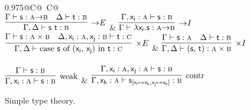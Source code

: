 \begin{figure}
	\centering
	\begin{tabularx}{0.975\textwidth}{@{}C@{~}C@{}}
		\\[2em]
		$\infer[\ii E]{\Gamma, \Delta \vdash \term{s~t} : \prop B}{\Gamma \vdash \term{s} : \prop A \ii \prop B & \Delta \vdash \term{t} : \prop B}$ 
		& 
		$\infer[\ii I]{\Gamma \vdash \term{\lambda x_i .s} : \prop A \ii \prop B}{\Gamma, \term{x_i }: \prop A \vdash \term{s}:\prop B}$\\[2em]
		$\infer[\times E]
			{\Gamma,\Delta \vdash
			 \cterm{case \term{s} of (\term{x_i }, \term{x_j}) in \term{t}} 
			 : \prop{C}}
			{\Gamma \vdash \term{s}: \prop A \times \prop B & 
			\Delta, \term{x_i }: \prop A , \term{x_j}: \prop B \vdash \term{t}: \prop{C}}$ 
		&
		$\infer[\times I]
			{\Gamma, \Delta \vdash \cterm{(\term{s}, \term{t})}: \prop{A} \times \prop{B}}
			{\Gamma \vdash \term{s}: \prop{A} & \Delta \vdash \term{t}:\prop{B}}$\\[\smallsep]
		\\[2em]
		$\infer[\Weakening{}]
			{\Gamma, \term{x_i }: \prop{A} \vdash \term{s}: \prop{B}}
			{\Gamma \vdash \term{s}:\prop{B}} $ 
		&
		$\infer[\Contraction{}]
			{\Gamma, \term{x_k}: \prop{A} \vdash \term{s}_{[\term{x_i } \mapsto \term{x_k}, \term{x_j} \mapsto \term{x_k}]}:\prop{B}}
			{\Gamma,  \term{x_i }: \prop{A}, \term{x_j}: \prop{A} \vdash \term{s}: \prop{B}}$
		\end{tabularx}
	\caption{Simple type theory.}
	\label{figure:simple_type_theory}
\end{figure}

